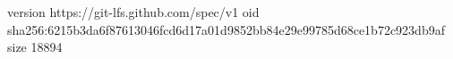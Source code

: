 version https://git-lfs.github.com/spec/v1
oid sha256:6215b3da6f87613046fcd6d17a01d9852bb84e29e99785d68ce1b72c923db9af
size 18894
